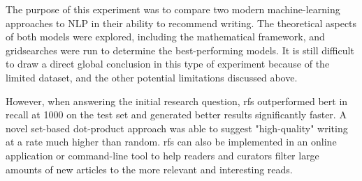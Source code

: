 The purpose of this experiment was to compare two modern machine-learning approaches to NLP in their ability to recommend writing. The theoretical aspects of both models were explored, including the mathematical framework, and gridsearches were run to determine the best-performing models. It is still difficult to draw a direct global conclusion in this type of experiment because of the limited dataset, and the other potential limitations discussed above.

However, when answering the initial research question, \acrlong{rfs} outperformed \acrshort{bert} in recall at 1000 on the test set and generated better results significantly faster. A novel set-based dot-product approach was able to suggest "high-quality" writing at a rate much higher than random. \acrshort{rfs} can also be implemented in an online application or command-line tool to help readers and curators filter large amounts of new articles to the more relevant and interesting reads.